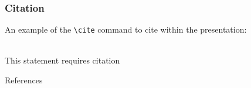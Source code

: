 \documentclass[aspectratio=169,xcolor=dvipsnames, t]{beamer}
\begin{document}
    \begin{frame}[fragile] %
        \frametitle{Citation}
        An example of the \verb|\cite| command to cite within the presentation:\\~
        
        This statement requires citation \cite{ahmed2013distributed}
    \end{frame}

    \begin{frame}[allowframebreaks]{References}
        \footnotesize
        \renewcommand{\bibsection}{}
        
    \end{frame}

    \makefinalpage
\end{document}
